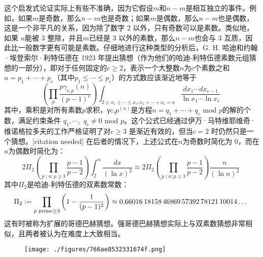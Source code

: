 这个启发式论证实际上有些不准确，因为它假设\(m\)和\(n-m\)是相互独立的事件。例如，如果\(m\)是奇数，那么\(n-m\)也是奇数；如果\(m\)是偶数，那么\(n-m\)也是偶数，这是一个非平凡的关系，因为除了数字 2 以外，只有奇数可以是素数。类似地，如果 \(n\)能被 3 整除，并且\(m\)已经是 3 以外的素数，那么\(n-m\)也会与 3 互质，因此比一般数字更有可能是素数。仔细地进行这种类型的分析后，G. H. 哈迪和约翰·埃登索尔·利特伍德在 1923 年提出猜想（作为他们的哈迪-利特伍德素数元组猜想的一部分），即对于任何固定的\(c\ge2\)，表示一个大整数\(n\)为\(c\)个素数之和\(n = p_1+\cdots +p_c\)（其中\(p_1 \leq \cdots \leq p_c\)）的方式数应该渐近地等于
\[
\left(\prod _{p}{\frac {p\gamma _{c,p}(n)}{(p-1)^{c}}}\right)\int _{2\leq x_{1}\leq \cdots \leq x_{c}:x_{1}+\cdots +x_{c}=n}{\frac {dx_{1}\cdots dx_{c-1}}{\ln x_{1}\cdots \ln x_{c}}}~
\]
其中，乘积是对所有素数\(p\)求积，γc,\(p^{(n)}\)是方程\(n = q_1 + \cdots + q_c\) mod \(p\)的解的个数，满足约束条件 \(q_1,\cdots,\) \(q_c\ne0\) mod \(p\)。这个公式已经通过伊万·马特维耶维奇·维诺格拉多夫的工作严格证明了对\(c\ge3\) 是渐近有效的，但当\(c=2\) 时仍然只是一个猜想。[citation needed] 在后者的情况下，上述公式在\(n\)为奇数时简化为 0，而在\(n\)为偶数时简化为：
\[
2\Pi _{2}\left(\prod _{p\mid n;p\geq 3}{\frac {p-1}{p-2}}\right)\int _{2}^{n}{\frac {dx}{(\ln x)^{2}}}\approx 2\Pi _{2}\left(\prod _{p\mid n;p\geq 3}{\frac {p-1}{p-2}}\right){\frac {n}{(\ln n)^{2}}}~
\]
其中\(\Pi _{2}\)是哈迪-利特伍德的双素数常数：
\[
\Pi _{2}:=\prod _{p\;{\rm {prime}}\geq 3}\left(1-{\frac {1}{(p-1)^{2}}}\right)\approx 0.66016\,18158\,46869\,57392\,78121\,10014\dots~
\]
这有时被称为扩展的哥德巴赫猜想。强哥德巴赫猜想实际上与双素数猜想非常相似，且两者被认为在难度上大致相当。
\begin{figure}[ht]
\centering
\texttt{[image: ./figures/766ae8532331674f.png]}
\caption{} \label{fig_GDBHCX_4}
\end{figure}